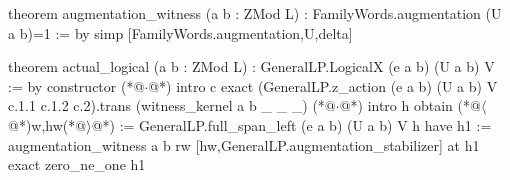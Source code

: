 theorem augmentation_witness (a b : ZMod L) : FamilyWords.augmentation (U a b)=1 := by
  simp [FamilyWords.augmentation,U,delta]

theorem actual_logical (a b : ZMod L) : GeneralLP.LogicalX (e a b) (U a b) V := by
  constructor
  (*@$\cdot$@*) intro c
    exact (GeneralLP.z_action (e a b) (U a b) V c.1.1 c.1.2 c.2).trans (witness_kernel a b _ _ _)
  (*@$\cdot$@*) intro h
    obtain (*@$\langle$@*)w,hw(*@$\rangle$@*) := GeneralLP.full_span_left (e a b) (U a b) V h
    have h1 := augmentation_witness a b
    rw [hw,GeneralLP.augmentation_stabilizer] at h1
    exact zero_ne_one h1
